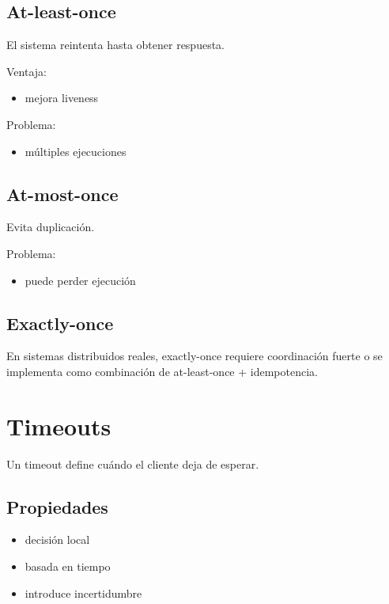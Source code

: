 \documentclass[variant=apuntes,cover=institutional,mode=screen]{ua-engineering-v6-article}
\begin{document}
\subsection{At-least-once}

El sistema reintenta hasta obtener respuesta.

Ventaja:
\begin{itemize}
\item mejora liveness
\end{itemize}

Problema:
\begin{itemize}
\item múltiples ejecuciones
\end{itemize}

\subsection{At-most-once}

Evita duplicación.

Problema:
\begin{itemize}
\item puede perder ejecución
\end{itemize}

\subsection{Exactly-once}

\begin{uakeybox}
En sistemas distribuidos reales, exactly-once requiere coordinación fuerte o se implementa como combinación de at-least-once + idempotencia.
\end{uakeybox}

\section{Timeouts}

Un timeout define cuándo el cliente deja de esperar.

\subsection{Propiedades}

\begin{itemize}
\item decisión local
\item basada en tiempo
\item introduce incertidumbre
\end{itemize}
\end{document}
